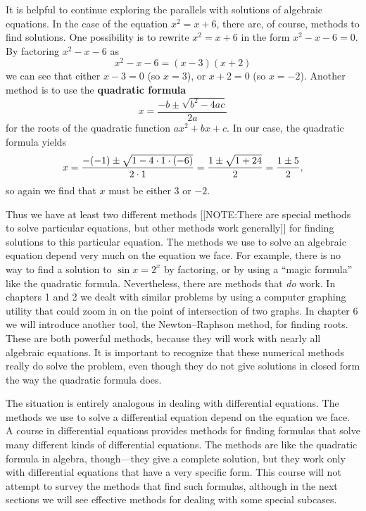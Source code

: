 It is helpful to continue exploring the parallels with solutions of
algebraic equations.  In the case of the equation $x^2 = x + 6$, there
are, of course, methods to find solutions.  One possibility is to
rewrite $x^2 = x + 6$ in the form $x^2 - x - 6 = 0$.  By factoring
$x^2 - x - 6$ as
	\[
x^2 - x - 6 = (x - 3)(x + 2)
\]
we can see that either $x - 3 = 0$ (so $x = 3$), or $x + 2 = 0$ (so $x
= -2$).  Another method is to use the {\bf quadratic
  formula}
	\[
x = \dfrac{-b \pm \sqrt{b^2 - 4ac}}{2a}
\]
for the roots of the quadratic function $ax^2 + bx + c$.  In our case,
the quadratic formula yields
	\[
x = \dfrac{-(-1) \pm \sqrt{1 - 4 \cdot 1 \cdot (-6)}} 
			{2 \cdot 1} 
		= \dfrac{1 \pm \sqrt{1 + 24\vphantom{(-6)}}}{2} 
		= \dfrac{1 \pm 5}{2},
\]
so again we find that $x$ must be either 3 or $-2$.  

\pagebreak

Thus we have at least two different methods 
[[NOTE:There are special methods to solve particular equations, but other methods work generally]]
for finding solutions to this particular equation.  The methods we use
to solve an algebraic equation depend very much on the equation we
face.  For example, there is no way to find a solution to $\sin{x} =
2^x$ by factoring, or by using a ``magic formula'' like the quadratic
formula.  Nevertheless, there are methods that {\em do\/} work.  In
chapters 1 and 2 we dealt with similar problems by using a computer
graphing utility that could zoom in on the point of intersection of
two graphs.  In chapter 6 we will introduce another tool, the
Newton--Raphson method, for finding roots.  These are both powerful
methods, because they will work with nearly all algebraic equations.
It is important to recognize that these numerical methods really do
solve the problem, even though they do not give solutions in closed
form the way the quadratic formula does.

The situation is entirely analogous in dealing with differential
equations.  The methods we use to solve a differential equation depend
on the equation we face.  A course in differential equations provides
methods for finding formulas that solve many different kinds of
differential equations.  The methods are like the quadratic formula in
algebra, though---they give a complete solution, but they work only
with differential equations that have a very specific form.  This
course will not attempt to survey the methods that find such formulas,
although in the next sections we will see effective methods for
dealing with some special subcases.



